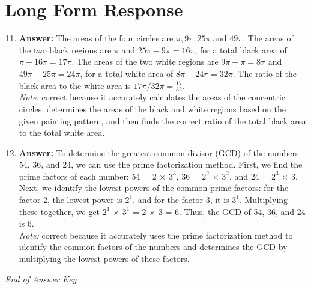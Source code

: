\documentclass[12pt]{article}
\begin{document}
\section*{Long Form Response}
\begin{enumerate}[label=\arabic*.]
\setcounter{enumi}{10}
\item \textbf{Answer:} The areas of the four circles are $\pi, 9\pi, 25\pi$ and $49\pi$. The areas of the two black regions are $\pi$ and $25\pi - 9\pi = 16\pi$, for a total black area of $\pi + 16\pi = 17\pi$. The areas of the two white regions are $9\pi - \pi = 8\pi$ and $49\pi - 25\pi = 24\pi$, for a total white area of $8\pi + 24\pi = 32\pi$. The ratio of the black area to the white area is $17\pi/32\pi = \boxed{\frac{17}{32}}.$
\\ \textit{Note:} correct because it accurately calculates the areas of the concentric circles, determines the areas of the black and white regions based on the given painting pattern, and then finds the correct ratio of the total black area to the total white area.
\item \textbf{Answer:} To determine the greatest common divisor (GCD) of the numbers 54, 36, and 24, we can use the prime factorization method. First, we find the prime factors of each number: 54 = 2 \ensuremath{\times} $3^3$, 36 = $2^2$ \ensuremath{\times} $3^2$, and 24 = $2^3$ \ensuremath{\times} 3. Next, we identify the lowest powers of the common prime factors: for the factor 2, the lowest power is $2^1$, and for the factor 3, it is $3^1$. Multiplying these together, we get $2^1$ \ensuremath{\times} $3^1$ = 2 \ensuremath{\times} 3 = 6. Thus, the GCD of 54, 36, and 24 is 6.
\\ \textit{Note:} correct because it accurately uses the prime factorization method to identify the common factors of the numbers and determines the GCD by multiplying the lowest powers of these factors.
\end{enumerate}

\vfill
\noindent\textit{End of Answer Key}
\end{document}
